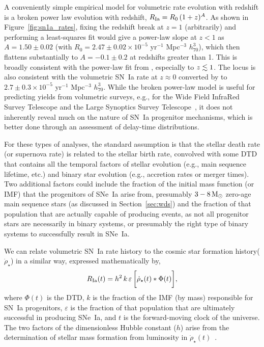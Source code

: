 \documentclass[apj, twocolumn]{aastex62}
\begin{document}
A conveniently simple empirical model for volumetric rate evolution with redshift is a broken power law evolution with redshift, $R_{\rm Ia}=R_0\,(1+z)^A$. As shown in Figure~\ref{fig:sn1a_rates}, fixing the redshift break at $z=1$ (arbitrarily) and performing a least-squares fit would give a power-law slope at $z<1$ as $A=1.50\pm0.02$ (with $R_0 = 2.47\pm0.02\times10^{-5}$ yr$^{-1}$ Mpc$^{-3}$ $h_{70}^3$), which then flattens substantially to $A=-0.1\pm0.2$ at redshifts greater than 1. This is broadly consistent with the power-law fit from \cite{Okumura:2014}, especially to $z\lesssim1$. The locus is also consistent with the volumetric SN~Ia rate at $z\approx0$ converted by \cite{Li:2011b} to $2.7\pm0.3\times10^{-5}$ yr$^{-1}$ Mpc$^{-3}$ $h_{70}^3$. While the broken power-law model is useful for predicting yields from volumetric surveys, e.g., for the Wide Field InfraRed Survey Telescope \cite[\textit{WFIRST, }][]{Hounsell:2018fv} and the Large Synoptics Survey Telescope~\cite[\textit{LSST, }][]{Kessler:2019fr}, it does not inherently reveal much on the nature of SN~Ia progenitor mechanisms, which is better done through an assessment of delay-time distributions.

For these types of analyses, the standard assumption is that the stellar death rate (or supernova rate) is related to the stellar birth rate, convolved with some DTD that contains all the temporal factors of stellar evolution (e.g., main sequence lifetime, etc.) and binary star evolution (e.g., accretion rates or merger times). Two additional factors could include the fraction of the initial mass function (or IMF) that the progenitors of SNe~Ia arise from, presumably $3 - 8\, \rm{M}_{\odot}$ zero-age main sequence stars (as discussed in Section~\ref{sec:wds}) and the fraction of that population that are actually capable of producing events, as not all progenitor stars are necessarily in binary systems, or presumably the right type of binary systems to successfully result in SNe~Ia.

We can relate volumetric SN~Ia rate history to the cosmic star formation history($\dot{\rho}_{\star}$) in a similar way, expressed mathematically by, 
\begin{equation}
R_{\rm Ia}(t) =  h^2\,k\,\varepsilon\,\biggl[\dot{\rho}_{\star}(t) \ast \Phi(t)\biggr],
\label{eqn:std}
\end{equation}
\noindent where $\Phi(t)$ is the DTD, $k$ is the fraction of the IMF (by mass) responsible for SN~Ia progenitors, $\varepsilon$ is the fraction of that population that are ultimately successful in producing SNe~Ia, and $t$ is the forward-moving clock of the universe. The two factors of the dimensionless Hubble constant ($h$) arise from the determination of stellar mass formation from luminosity in $\dot{\rho}_{\star}(t)$~\citep[see][]{Croton:2013ty}.
\end{document}
